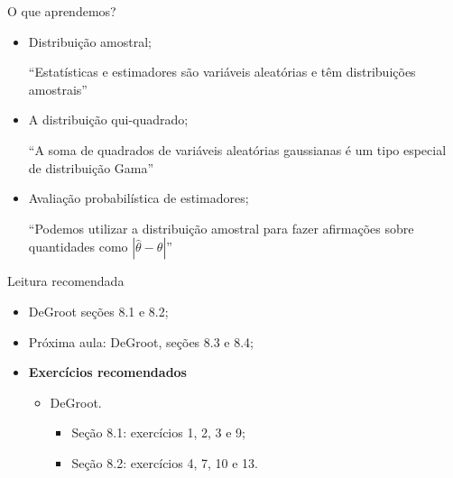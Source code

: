 \begin{frame}{O que aprendemos?}
\begin{itemize}

  \item[\faLightbulbO] Distribuição amostral;    
  
   ``Estatísticas e estimadores são variáveis aleatórias e têm distribuições amostrais''
  
  \item[\faLightbulbO] A distribuição qui-quadrado;
  
  ``A soma de quadrados de variáveis aleatórias gaussianas é um tipo especial de distribuição Gama''
  
  \item[\faLightbulbO] Avaliação probabilística de estimadores;
  
  ``Podemos utilizar a distribuição amostral para fazer afirmações sobre quantidades como $|\hat{\theta}-\theta|$''
  
  \end{itemize}
 \end{frame}

\begin{frame}{Leitura recomendada}
\begin{itemize}
 \item[\faBook] DeGroot seções 8.1 e 8.2;
  \item[\faForward] Próxima aula: DeGroot, seções 8.3 e 8.4;
 \item {\large\textbf{Exercícios recomendados}}
 \begin{itemize}
  \item[\faBookmark] DeGroot.
  \begin{itemize}
   \item Seção 8.1: exercícios 1, 2, 3 e 9;
   \item Seção 8.2: exercícios 4, 7, 10 e 13.
  \end{itemize}   
  \end{itemize}
 \end{itemize} 
\end{frame}
